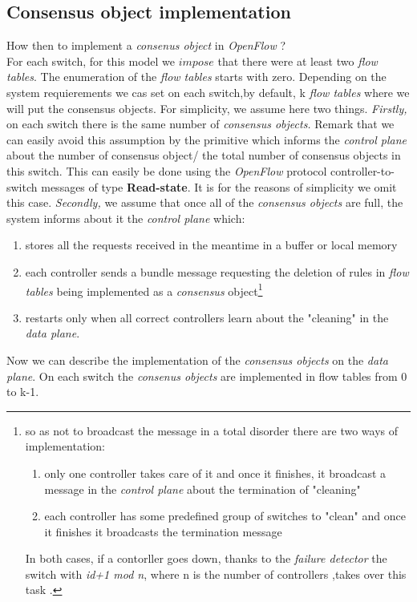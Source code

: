 \documentclass{article}
\theoremstyle{remark}
\begin{document}
\subsection{Consensus object implementation}
How then to implement a \emph{consenus object} in \emph{OpenFlow} ? \\
For each switch, for this model we $impose$ that there were at least two \emph{flow tables}. The enumeration of the \emph{flow tables} starts with zero. Depending on the system requierements we cas set on each switch,by default, k \emph{flow tables} where we will put the consensus objects. For simplicity, we assume here two things. \emph{Firstly,} on each switch there is the same number of \emph{consensus objects.} Remark that we can easily avoid this assumption by the primitive which informs the \emph{control plane} about the number of consensus object/ the total number of consensus objects in this switch. This can easily be done using the \emph{OpenFlow} protocol controller-to-switch messages of type \textbf{Read-state}. It is for the reasons of simplicity we omit this case. \emph{Secondly,} we assume that once all of the \emph{consensus objects} are full, the system informs about it the \emph{control plane} which:
\begin{enumerate}
\item stores all the requests received in the meantime in a buffer or local memory
\item each controller sends a bundle message requesting the deletion of rules in \emph{flow tables} being implemented as a \emph{consensus} object\footnote{so as not to broadcast the message in a total disorder there are two ways of implementation:
\begin{enumerate}
\item only one controller takes care of it and once it finishes, it broadcast a message in the \emph{control plane} about the termination of "cleaning"
\item each controller has some predefined group of switches to "clean" and once it finishes it broadcasts the termination message
\end{enumerate}
In both cases, if a contorller goes down, thanks to the \emph{failure detector} the switch with \emph{id+1 mod n}, where n is the number of controllers ,takes over this task . 
}
\item restarts only when all correct controllers learn about the "cleaning" in the \emph{data plane}. 
\end{enumerate}
Now we can describe the implementation of the \emph{consensus objects} on the \emph{data plane}. On each switch the \emph{consenus objects} are implemented in flow tables from 0 to k-1.
\end{document}
